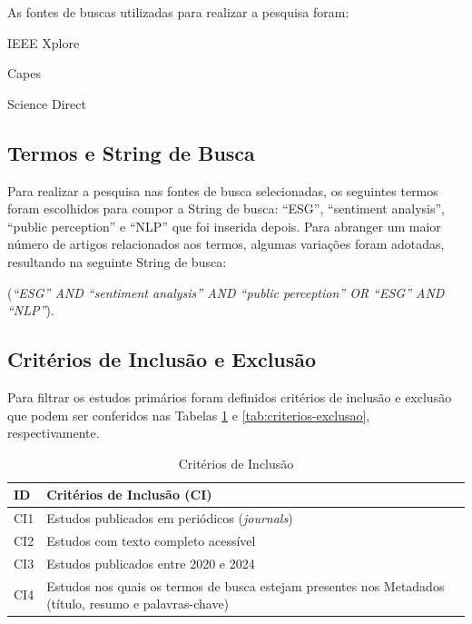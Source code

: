 As fontes de buscas utilizadas para realizar a pesquisa foram:

\begin{alineas}
    \item IEEE Xplore
    \item Capes
    \item Science Direct
\end{alineas}

\subsection{Termos e String de Busca}
\label{subsec:termos-busca}

Para realizar a pesquisa nas fontes de busca selecionadas, os seguintes termos foram
escolhidos para compor a String de busca: ``ESG'', ``sentiment analysis'', ``public perception'' e
``NLP'' que foi inserida depois. Para abranger um maior número de artigos relacionados aos termos,
algumas variações foram adotadas, resultando na seguinte String de busca:

\begin{citacao}
(\textit{``ESG'' AND ``sentiment analysis'' AND ``public perception'' OR ``ESG'' AND ``NLP''}).
\end{citacao}

\subsection{Critérios de Inclusão e Exclusão}
\label{subsec:criterios}

Para filtrar os estudos primários foram definidos critérios de inclusão e exclusão que podem
ser conferidos nas Tabelas \ref{tab:criterios-inclusao} e \ref{tab:criterios-exclusao},
respectivamente.

\begin{table}[h]
\caption{Critérios de Inclusão}
\label{tab:criterios-inclusao}
\begin{tabular}{p{1.5cm}p{11cm}}
\hline
\textbf{ID} & \textbf{Critérios de Inclusão (CI)} \\
\hline
CI1 & Estudos publicados em periódicos (\textit{journals}) \\
CI2 & Estudos com texto completo acessível \\
CI3 & Estudos publicados entre 2020 e 2024 \\
CI4 & Estudos nos quais os termos de busca estejam presentes nos Metadados (título, resumo e palavras-chave) \\
\hline
\end{tabular}
\end{table}

